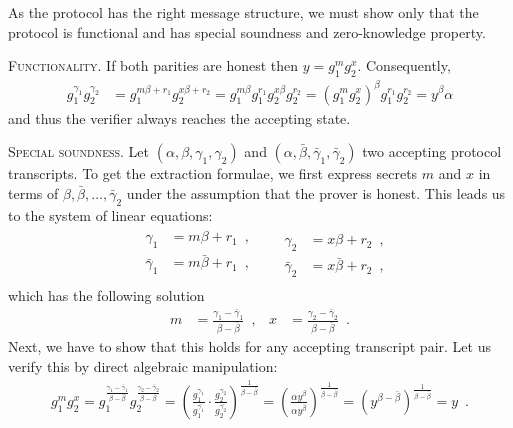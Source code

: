 \documentclass{crypto-exercise}
\begin{document}
\begin{solution}
As the protocol has the right message structure, we must show only that the protocol is functional and has special soundness and zero-knowledge property. 

\vspace*{2ex}
\noindent
\textsc{Functionality.} 
If both parities are honest then $y=g_1^mg_2^x$. Consequently,
\begin{align*}
g_1^{\gamma_1}g_2^{\gamma_2}
& = g_1^{m\beta + r_1}g_2^{x\beta + r_2} 
  = g_1^{m\beta}g_1^{r_1}g_2^{x\beta}g_2^{r_2}
  =  \left(g_1^{m}g_2^{x}\right)^{\beta}g_1^{r_1}g_2^{r_2}
  =  y^{\beta}\alpha
\end{align*}
and thus the verifier always reaches the accepting state.

\vspace*{2ex}
\noindent
\textsc{Special soundness.}
Let $(\alpha,\beta,\gamma_1,\gamma_2)$ and $(\alpha,\bar{\beta},\bar{\gamma}_1,\bar{\gamma}_2)$ two accepting protocol transcripts. To get the extraction formulae, we first express secrets $m$ and $x$ in terms of $\beta,\bar{\beta},\ldots,\bar{\gamma}_2$ under the assumption that the prover is honest. This leads us to the system of linear equations: 
\begin{align*}
&\begin{aligned}
\gamma_1 &= m\beta+r_1\enspace,\\
\bar{\gamma}_1 &= m\bar{\beta}+r_1\enspace,\\
\end{aligned}
&&
\begin{aligned} 
\gamma_2 &= x\beta+r_2\enspace,\\
\bar{\gamma}_2 &= x\bar{\beta}+r_2\enspace,
\end{aligned}
\end{align*}
which has the following solution
\begin{align*}
m &= \frac{\gamma_1 - \bar{\gamma}_1}{\beta - \bar{\beta}}\enspace,
&
x &= \frac{\gamma_2 - \bar{\gamma}_2}{\beta - \bar{\beta}}\enspace. 
\end{align*}
Next, we have to show that this holds for any accepting transcript pair. Let us verify this by direct algebraic manipulation:
\begin{align*}
g_1^mg_2^x=g_1^{\frac{\gamma_1 - \bar{\gamma}_1}{\beta - \bar{\beta}}}g_2^{\frac{\gamma_2 - \bar{\gamma}_2}{\beta - \bar{\beta}}} 
= \left(\frac{g_1^{\gamma_1}}{g_1^{\bar{\gamma_1}}}\cdot\frac{g_2^{\gamma_2}}{g_2^{\bar{\gamma_2}}}\right)^{\frac{1}{\beta - \bar{\beta}}} 
=  \left(\frac{\alpha y^{\beta}}{\alpha y^{\bar{\beta}}}\right)^{\frac{1}{\beta - \bar{\beta}}} 
 =  \left(y^{\beta - \bar{\beta}}\right)^{\frac{1}{\beta - \bar{\beta}}} 
 =  y\enspace.
\end{align*}


\end{solution}
\end{document}
